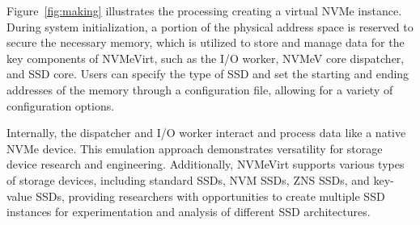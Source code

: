 
Figure~\ref{fig:making} illustrates the processing creating a virtual NVMe instance.
During system initialization, a portion of the physical address space is reserved to secure the necessary memory, which is utilized to store and manage data for the key components of NVMeVirt, such as the I/O worker, NVMeV core dispatcher, and SSD core.
Users can specify the type of SSD and set the starting and ending addresses of the memory through a configuration file, allowing for a variety of configuration options.

Internally, the dispatcher and I/O worker interact and process data like a native NVMe device.
This emulation approach demonstrates versatility for storage device research and engineering.
Additionally, NVMeVirt supports various types of storage devices, including standard SSDs, NVM SSDs, ZNS SSDs, and key-value SSDs, providing researchers with opportunities to create multiple SSD instances for experimentation and analysis of different SSD architectures.





